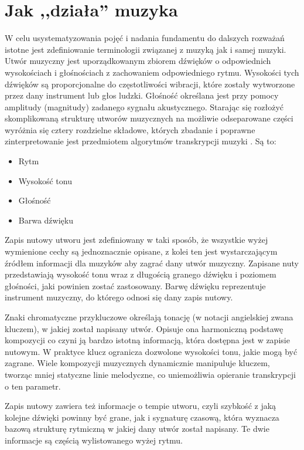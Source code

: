 \documentclass[12pt,a4paper,twoside]{mwart}
\begin{document}
\newpage
\setcounter{secnumdepth}{4}

\section{Jak ,,działa'' muzyka}\label{sec:JakDzialaMuzyka}
W celu usystematyzowania pojęć i nadania fundamentu do dalszych rozważań istotne jest zdefiniowanie terminologii związanej z muzyką jak i samej muzyki. Utwór muzyczny jest uporządkowanym zbiorem dźwięków o odpowiednich wysokościach i głośnościach z zachowaniem odpowiedniego rytmu. Wysokości tych dźwięków są proporcjonalne do częstotliwości wibracji, które zostały wytworzone przez dany instrument lub głos ludzki. Głośność określana jest przy pomocy amplitudy (magnitudy) zadanego sygnału akustycznego. Starając się rozłożyć skomplikowaną strukturę utworów muzycznych na możliwie odseparowane części wyróżnia się cztery rozdzielne składowe, których zbadanie i poprawne zinterpretowanie jest przedmiotem algorytmów transkrypcji muzyki
\cite[63]{Homerecording:DlaKazdego}.
Są to:
\begin{itemize}
\item Rytm
\item Wysokość tonu
\item Głośność
\item Barwa dźwięku
\end{itemize}
Zapis nutowy utworu jest zdefiniowany w taki sposób, że wszystkie wyżej wymienione cechy są jednoznacznie opisane, z kolei ten jest wystarczającym źródłem informacji dla muzyków aby zagrać dany utwór muzyczny. Zapisane nuty przedstawiają wysokość tonu wraz z długością granego dźwięku i poziomem głośności, jaki powinien zostać zastosowany. Barwę dźwięku reprezentuje instrument muzyczny, do którego odnosi się dany zapis nutowy.

Znaki chromatyczne przykluczowe określają tonację (w notacji angielskiej zwana kluczem), w jakiej został napisany utwór. Opisuje ona harmoniczną podstawę kompozycji co czyni ją bardzo istotną informacją, która dostępna jest w zapisie nutowym. W praktyce klucz ogranicza dozwolone wysokości tonu, jakie mogą być zagrane. Wiele kompozycji muzycznych dynamicznie manipuluje kluczem, tworząc mniej statyczne linie melodyczne, co uniemożliwia opieranie transkrypcji o ten parametr.

Zapis nutowy zawiera też informacje o tempie utworu, czyli szybkość z jaką kolejne dźwięki powinny być grane, jak i sygnaturę czasową, która wyznacza bazową strukturę rytmiczną w jakiej dany utwór został napisany. Te dwie informacje są częścią wylistowanego wyżej rytmu.
\end{document}
